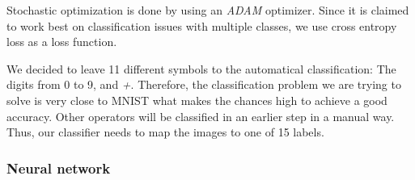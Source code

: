 \documentclass[12pt]{article}
\begin{document}
\begin{itemize}
\begin{itemize}
\begin{itemize}
\begin{itemize}
\begin{itemize}
\begin{itemize}
\begin{itemize}
\begin{itemize}
\begin{itemize}
\begin{itemize}
		Stochastic optimization is done by using an \textit{ADAM}\cite{adam} optimizer. Since it is claimed to work best on classification issues with multiple classes, we use cross entropy loss as a loss function.
		
		We decided to leave 11 different symbols to the automatical classification: The digits from 0 to 9,  and \textit{+}. Therefore, the classification problem we are trying to solve is very close to MNIST what makes the chances high to achieve a good accuracy. Other operators will be classified in an earlier step in a manual way. Thus, our classifier needs to map the images to one of 15 labels.
				
		\subsubsection{Neural network}
		

\end{itemize}
\end{itemize}
\end{itemize}
\end{itemize}
\end{itemize}
\end{itemize}
\end{itemize}
\end{itemize}
\end{itemize}
\end{itemize}
\end{document}
